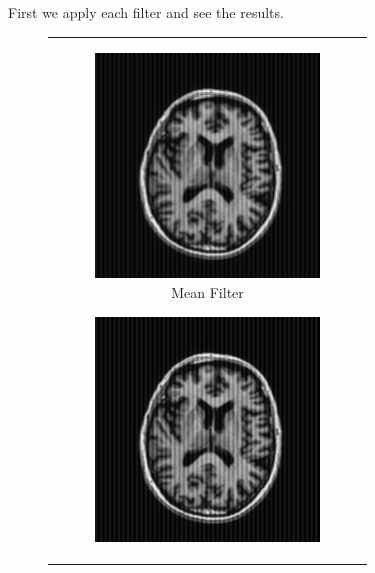 \documentclass[hidelinks,12pt]{article}
\begin{document}
	\pagebreak
	
	 First we apply each filter and see the results.
	
	\begin{figure}[!h]
		\centering
		\begin{tabular}{c}
			\begin{subfigure}[h]{0.3\textwidth}
				\centering
				\includegraphics[width=\textwidth]{figures/brain_mri/mean.jpg}
				\caption{Mean Filter}
			\end{subfigure}
			\hfill
			\begin{subfigure}[h]{0.3\textwidth}
				\centering
				\includegraphics[width=\textwidth]{figures/brain_mri/gaussian.jpg}

\end{subfigure}
\end{tabular}
\end{figure}
\end{document}
